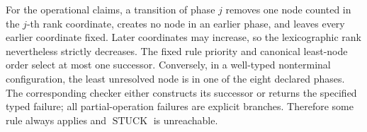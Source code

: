 For the operational claims, a transition of phase \(j\) removes one node counted in the \(j\)-th rank coordinate, creates no node in an earlier phase, and leaves every earlier coordinate fixed. Later coordinates may increase, so the lexicographic rank nevertheless strictly decreases. The fixed rule priority and canonical least-node order select at most one successor. Conversely, in a well-typed nonterminal configuration, the least unresolved node is in one of the eight declared phases. The corresponding checker either constructs its successor or returns the specified typed failure; all partial-operation failures are explicit branches. Therefore some rule always applies and \(\operatorname{STUCK}\) is unreachable.